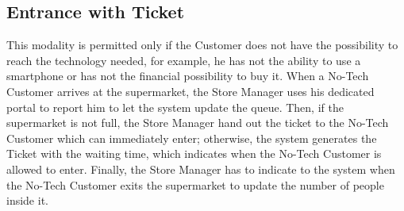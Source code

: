 \subsection{Entrance with Ticket}

This modality is permitted only if the Customer does not have the possibility to reach the technology needed, for example, he has not the ability to use a smartphone or has not the financial possibility to buy it. When a No-Tech Customer arrives at the supermarket, the Store Manager uses his dedicated portal to report him to let the system update the queue. Then, if the supermarket is not full, the Store Manager hand out the ticket to the No-Tech Customer which can immediately enter; otherwise, the system generates the Ticket with the waiting time, which indicates when the No-Tech Customer is allowed to enter. 
Finally, the Store Manager has to indicate to the system when the No-Tech Customer exits the supermarket to update the number of people inside it.
